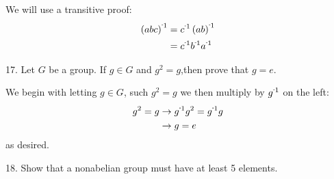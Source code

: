 \begin{mdframed}[style=darkAnswer,frametitle={Joe Starr}]
We will use a transitive proof:
\begin{align*}
\inv{\lrp{abc}} & = \inv{c}\inv{\lrp{ab}} \\
& = \inv{c}\inv{b}\inv{a}
\end{align*}
\end{mdframed}
\newpage
\begin{mdframed}[style=darkQuesion]
17. Let $G$ be a group. If $g\in G$ and $g^2=g$,then prove that $g=e$.
\end{mdframed}

\begin{mdframed}[style=darkAnswer,frametitle={Joe Starr}]
We begin with letting $g\in G$, such $g^2=g$ we then multiply by $\inv{g}$ on
the left:
\begin{align*}
g^2=g & \rightarrow \inv{g}g^2=\inv{g}g \\
& \rightarrow g=e
\end{align*}
as desired.
\end{mdframed}
\newpage
\begin{mdframed}[style=darkQuesion]
18. Show that a nonabelian group must have at least 5 elements.
\end{mdframed}

